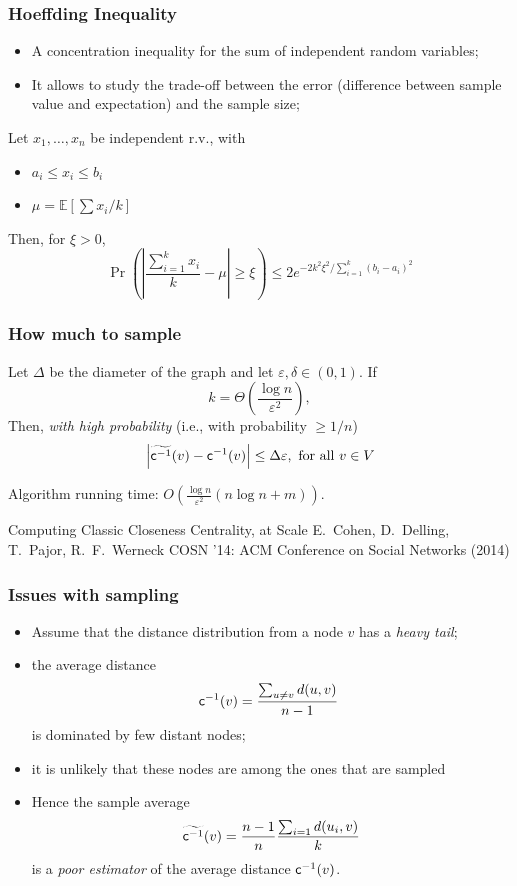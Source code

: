 \begin{frame}
  \frametitle{Hoeffding Inequality}
  \begin{itemize}
    \item A concentration inequality for the sum of independent random
      variables;
    \item It allows to study the trade-off between the error (difference between
      sample value and expectation) and the sample size;
  \end{itemize}
  \pause
  \begin{theorem}
    Let $x_1,\dotsc, x_n$ be independent r.v., with
    \begin{itemize}
      \item $a_i\le x_i\le b_i$
      \item $\mu=\mathbb{E}[\sum x_i/k]$
    \end{itemize}
    Then, for $\xi > 0$,
    \[
      \Pr\left(\left|\frac{\sum_{i=1}^kx_i}{k}-\mu\right|\ge\xi\right)\le
      2e^{-2k^2\xi^2/\sum_{i=1}^k(b_i-a_i)^2}
    \]
  \end{theorem}
\end{frame}

\begin{frame}
  \frametitle{How much to sample}
  \begin{lemma}
    Let $\Delta$ be the diameter of the graph and let
    $\varepsilon,\delta\in(0,1)$. If
    \[
      k=\Theta\left(\frac{\log n}{\varepsilon^2}\right),
    \]
    Then, \emph{with high probability} (i.e., with probability $\ge 1/n$)
    \[
      \left|\widetilde{\mathsf{c}^{-1}}(v)-\mathsf{c}^{-1}(v)\right|\le\Delta\varepsilon,
      \text{ for all } v\in V
    \]
  \end{lemma}
  \pause
  Algorithm running time: $O\left(\frac{\log n}{\varepsilon^2}(n\log n +
  m)\right)$.
\end{frame}

\begin{frame}
  \centering
  \vfill
  {\huge Computing Classic Closeness Centrality, at Scale}
  \vfill
  {\Large E.~Cohen, D.~Delling, T.~Pajor, R.~F.~Werneck}
  \vfill
  {\large COSN '14: ACM Conference on Social Networks (2014) }
  \vfill
\end{frame}

\begin{frame}
  \frametitle{Issues with sampling}
  \begin{itemize}
    \item Assume that the distance distribution from a node $v$ has a
      \emph{heavy tail};
    \item the average distance
      \[
        \mathsf{c}^{-1}(v)=\frac{\sum_{u\neq v}d(u,v)}{n-1}\enspace
      \]
      is dominated by few distant nodes;
    \pause
    \item it is unlikely that these nodes are among the ones that are sampled
    \pause
    \item Hence the sample average
      \[
        \widetilde{\mathsf{c}^{-1}}(v)=\frac{n-1}{n}\frac{\sum_{i=1}d(u_i,v)}{k}
      \]
      is a \emph{poor estimator} of the average distance $\mathsf{c}^{-1}(v)$.
  \end{itemize}
\end{frame}

